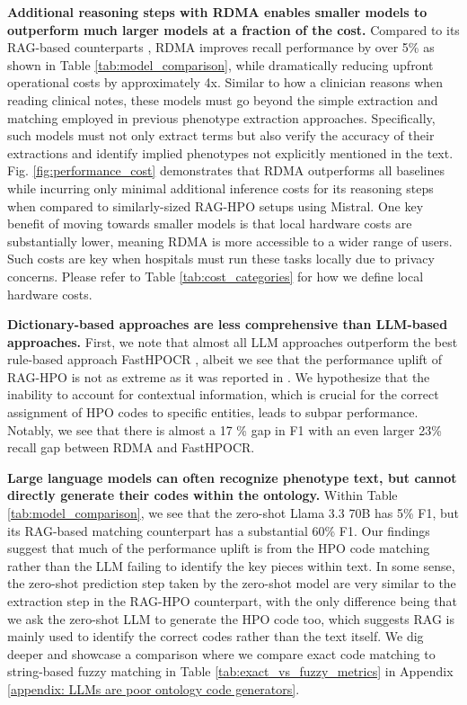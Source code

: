 \textbf{Additional reasoning steps with RDMA enables smaller models to outperform much larger models at a fraction of the cost.} Compared to its RAG-based counterparts \cite{garcia2024_HPORAG}, RDMA improves recall performance by over 5\% as shown in Table \ref{tab:model_comparison}, while dramatically reducing upfront operational costs by approximately 4x. Similar to how a clinician reasons when reading clinical notes, these models must go beyond the simple extraction and matching employed in previous phenotype extraction approaches. Specifically, such models must not only extract terms but also verify the accuracy of their extractions and identify implied phenotypes not explicitly mentioned in the text. Fig. \ref{fig:performance_cost} demonstrates that RDMA outperforms all baselines while incurring only minimal additional inference costs for its reasoning steps when compared to similarly-sized RAG-HPO setups using Mistral. One key benefit of moving towards smaller models is that local hardware costs are substantially lower, meaning RDMA is more accessible to a wider range of users. Such costs are key when hospitals must run these tasks locally due to privacy concerns. Please refer to Table \ref{tab:cost_categories} for how we define local hardware costs.

\textbf{Dictionary-based approaches are less comprehensive than LLM-based approaches.} First, we note that almost all LLM approaches outperform the best rule-based approach FastHPOCR \cite{groza2024fasthpocr}, albeit we see that the performance uplift of RAG-HPO is not as extreme as it was reported in \cite{garcia2024_HPORAG}. We hypothesize that the inability to account for contextual information, which is crucial for the correct assignment of HPO codes \cite{gargano2024mode_hpo} to specific entities, leads to subpar performance. Notably, we see that there is almost a 17 \% gap in F1 with an even larger 23\% recall gap between RDMA and FastHPOCR.

\textbf{Large language models can often recognize phenotype text, but cannot directly generate their codes within the ontology.} Within Table \ref{tab:model_comparison}, we see that the zero-shot Llama 3.3 70B has 5\% F1, but its RAG-based matching counterpart has a substantial 60\% F1. Our findings suggest that much of the performance uplift is from the HPO code matching rather than the LLM failing to identify the key pieces within text. In some sense, the zero-shot prediction step taken by the zero-shot model are very similar to the extraction step in the RAG-HPO counterpart, with the only difference being that we ask the zero-shot LLM to generate the HPO code too, which suggests RAG is mainly used to identify the correct codes rather than the text itself. We dig deeper and showcase a comparison where we compare exact code matching to string-based fuzzy matching in Table \ref{tab:exact_vs_fuzzy_metrics} in Appendix \ref{appendix: LLMs are poor ontology code generators}.

